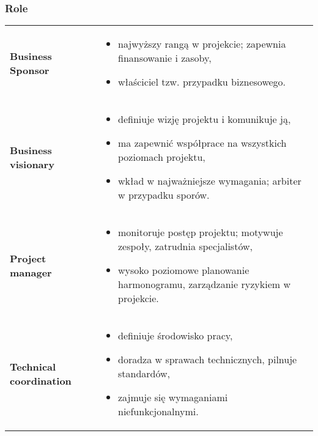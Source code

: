 \documentclass[../main.tex]{subfiles}
\begin{document}
    \subsubsection{Role}
    \begin{table}[H]
        \begin{center}
            \begin{tabular}{ p{} p{} }
                \textbf{Business Sponsor}
                &
                \begin{itemize}
                    \item najwyższy rangą w projekcie; zapewnia finansowanie i zasoby,
                    \item właściciel tzw. przypadku biznesowego.
                \end{itemize}
                \\


                \textbf{Business visionary}
                &
                \begin{itemize}
                    \item definiuje wizję projektu i komunikuje ją,
                    \item ma zapewnić współprace na wszystkich poziomach projektu,
                    \item wkład w najważniejsze wymagania; arbiter w przypadku sporów.
                \end{itemize}
                \\

                \textbf{Project manager}
                &
                \begin{itemize}
                    \item monitoruje postęp projektu; motywuje zespoły, zatrudnia specjalistów,
                    \item wysoko poziomowe planowanie harmonogramu, zarządzanie ryzykiem w projekcie.
                \end{itemize}
                \\

                \textbf{Technical coordination}
                &
                \begin{itemize}
                    \item definiuje środowisko pracy,
                    \item doradza w sprawach technicznych, pilnuje standardów,
                    \item zajmuje się wymaganiami niefunkcjonalnymi.
                \end{itemize}
                \\


\end{tabular}
\end{center}
\end{table}
\end{document}
